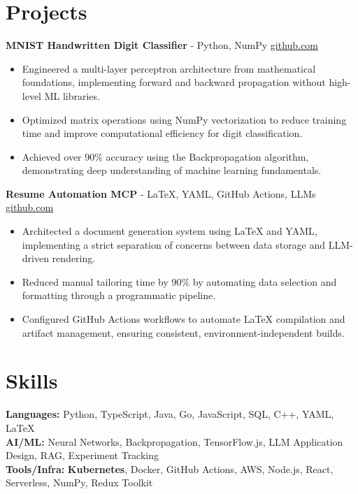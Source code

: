 \documentclass[11pt]{article}       %
\begin{document}
\vspace{-18.5pt}

\section*{Projects}

\textbf{MNIST Handwritten Digit Classifier}{ - Python, NumPy} \hfill \href{https://github.com/Monica20030707/Artificial-Neutral-Network_ML}{github.com} \\
\vspace{-9pt}
\begin{itemize}
  \item Engineered a multi-layer perceptron architecture from mathematical foundations, implementing forward and backward propagation without high-level ML libraries.
  \item Optimized matrix operations using NumPy vectorization to reduce training time and improve computational efficiency for digit classification.
  \item Achieved over 90\% accuracy using the Backpropagation algorithm, demonstrating deep understanding of machine learning fundamentals.
\end{itemize}

\textbf{Resume Automation MCP}{ - LaTeX, YAML, GitHub Actions, LLMs} \hfill \href{https://github.com/Monica20030707/Tex_OrangeLeaf-mcp}{github.com} \\
\vspace{-9pt}
\begin{itemize}
  \item Architected a document generation system using LaTeX and YAML, implementing a strict separation of concerns between data storage and LLM-driven rendering.
  \item Reduced manual tailoring time by 90\% by automating data selection and formatting through a programmatic pipeline.
  \item Configured GitHub Actions workflows to automate LaTeX compilation and artifact management, ensuring consistent, environment-independent builds.
\end{itemize}

\vspace{-18.5pt}


\section*{Skills}
\textbf{Languages:} Python, TypeScript, Java, Go, JavaScript, SQL, C++, YAML, LaTeX\\
\textbf{AI/ML:} Neural Networks, Backpropagation, TensorFlow.js, LLM Application Design, RAG, Experiment Tracking\\
\textbf{Tools/Infra:} \textbf{Kubernetes}, Docker, GitHub Actions, AWS, Node.js, React, Serverless, NumPy, Redux Toolkit\\

\vspace{-6.5pt}
\end{document}
